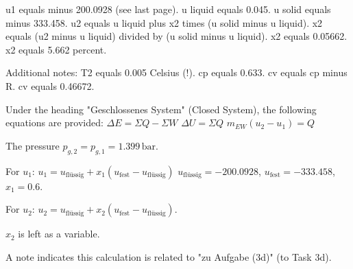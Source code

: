 u1 equals minus 200.0928 (see last page).  
u liquid equals 0.045.  
u solid equals minus 333.458.  
u2 equals u liquid plus x2 times (u solid minus u liquid).  
x2 equals (u2 minus u liquid) divided by (u solid minus u liquid).  
x2 equals 0.05662.  
x2 equals 5.662 percent.  

Additional notes:  
T2 equals 0.005 Celsius (!).  
cp equals 0.633.  
cv equals cp minus R.  
cv equals 0.46672.

Under the heading "Geschlossenes System" (Closed System), the following equations are provided:  
\( \Delta E = \Sigma Q - \Sigma W \)  
\( \Delta U = \Sigma Q \)  
\( m_{EW} (u_2 - u_1) = Q \)  

The pressure \( p_{g,2} = p_{g,1} = 1.399 \, \text{bar} \).  

For \( u_1 \):  
\( u_1 = u_{\text{flüssig}} + x_1 (u_{\text{fest}} - u_{\text{flüssig}}) \)  
\( u_{\text{flüssig}} = -200.0928 \), \( u_{\text{fest}} = -333.458 \), \( x_1 = 0.6 \).  

For \( u_2 \):  
\( u_2 = u_{\text{flüssig}} + x_2 (u_{\text{fest}} - u_{\text{flüssig}}) \).  

\( x_2 \) is left as a variable.  

A note indicates this calculation is related to "zu Aufgabe (3d)" (to Task 3d).